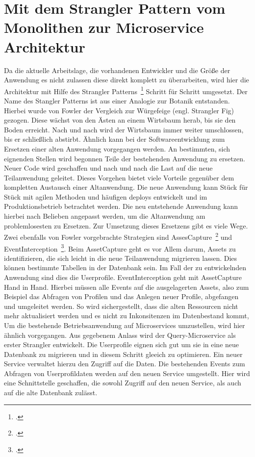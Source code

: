 \section{Mit dem Strangler Pattern vom Monolithen zur Microservice Architektur}
Da die aktuelle Arbeitslage, die vorhandenen Entwickler und die Größe der Anwendung es nicht zulassen diese direkt komplett zu überarbeiten, wird hier die Architektur mit Hilfe des Strangler Patterns~\footcite[][]{Fowler:Strangler} Schritt für Schritt umgesetzt.
Der Name des Stangler Patterns ist aus einer Analogie zur Botanik entstanden. Hierbei wurde von Fowler der Vergleich zur Würgefeige (engl. Strangler Fig) gezogen. Diese wächst von den Ästen an einem Wirtsbaum herab, bis sie den Boden erreicht. Nach und nach wird der Wirtsbaum immer weiter umschlossen, bis er schließlich abstirbt.
Ähnlich kann bei der Softwareentwicklung zum Ersetzen einer alten Anwendung vorgegangen werden. An bestimmten, sich eignenden Stellen wird begonnen Teile der bestehenden Anwendung zu ersetzen. Neuer Code wird geschaffen und nach und nach die Last auf die neue Teilanwendung geleitet.
Dieses Vorgehen bietet viele Vorteile gegenüber dem kompletten Austausch einer Altanwendung. Die neue Anwendung kann Stück für Stück mit agilen Methoden und häufigen deploys entwickelt und im Produktionsbetrieb betrachtet werden. Die neu entstehende Anwendung kann hierbei nach Belieben angepasst werden, um die Altanwendung am problemlosesten zu Ersetzen.
Zur Umsetzung dieses Ersetzens gibt es viele Wege. Zwei ebenfalls von Fowler vorgebrachte Strategien sind AssesCapture~\footcite[][]{Fowler:Capture} und EventInterception~\footcite[][]{Fowler:Interception}.
Beim AssetCapture geht es vor Allem darum, Assets zu identifizieren, die sich leicht in die neue Teilanwendung migrieren lassen. Dies können bestimmte Tabellen in der Datenbank sein. Im Fall der zu entwickelnden Anwendung sind dies die Userprofile.
EventInterception geht mit AssetCapture Hand in Hand. Hierbei müssen alle Events auf die ausgelagerten Assets, also zum Beispiel das Abfragen von Profilen und das Anlegen neuer Profile, abgefangen und umgeleitet werden.
So wird sichergestellt, dass die alten Ressourcen nicht mehr aktualisiert werden und es nicht zu Inkonsitenzen im Datenbestand kommt,
Um die bestehende Betriebsanwendung auf Microservices umzustellen, wird hier ähnlich vorgegangen. Aus gegebenem Anlass wird der Query-Microservice als erster Strangler entwickelt. Die Userprofile eignen sich gut um sie in eine neue Datenbank zu migrieren und in diesem Schritt gleeich zu optimieren. Ein neuer Service verwaltet hierzu den Zugriff auf die Daten. Die bestehenden Events zum Abfragen von Userprofildaten werden auf den neuen Service umgestellt. Hier wird eine Schnittstelle geschaffen, die sowohl Zugriff auf den neuen Service, als auch auf die alte Datenbank zulässt.
